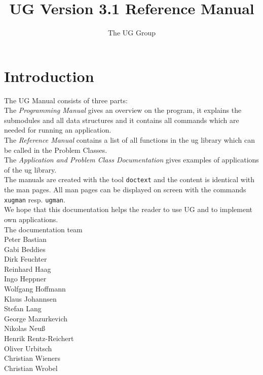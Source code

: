 


\pagestyle{myheadings}
\sloppy
\makeindex




\newcommand{\sectitle}{\mbox{}}
\setcounter{page}{0}

\title{UG Version 3.1 Reference Manual}
\author{The UG Group}
\maketitle



\section*{Introduction}

The UG Manual consists of three parts:
\\[5mm]  
The {\em Programming Manual} gives an overview on the program, it
explains the submodules and all data structures and it contains
all commands which are needed for running an application.
\\[5mm]  
The {\em Reference Manual} contains a list of all 
functions in the ug library which can be called in the Problem Classes.
\\[5mm]
The {\em Application and Problem Class Documentation} gives examples
of applications of the ug library.
\\[5mm]
The manuals are created with the tool {\tt doctext} and the content is 
identical with the man pages. All man pages can be displayed on screen 
with the commands {\tt xugman} resp. {\tt ugman}.
\\[5mm]
We hope that this documentation helps the reader to use UG 
and to implement own applications.
\\[1cm]
The documentation team
\\[1cm]
Peter Bastian\\
Gabi Beddies\\
Dirk Feuchter\\
Reinhard Haag\\
Ingo Heppner\\
Wolfgang Hoffmann\\
Klaus Johannsen\\
Stefan Lang\\
George Mazurkevich\\
Nikolas Neu\ss\\
Henrik Rentz-Reichert\\
Oliver Urbitsch\\
Christian Wieners\\
Christian Wrobel

